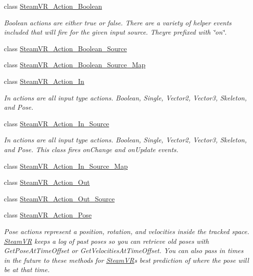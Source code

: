 \begin{DoxyCompactItemize}
class \mbox{\hyperlink{class_valve_1_1_v_r_1_1_steam_v_r___action___boolean}{Steam\+V\+R\+\_\+\+Action\+\_\+\+Boolean}}
\begin{DoxyCompactList}\small\item\em Boolean actions are either true or false. There are a variety of helper events included that will fire for the given input source. They\textquotesingle{}re prefixed with \char`\"{}on\char`\"{}. \end{DoxyCompactList}\item 
class \mbox{\hyperlink{class_valve_1_1_v_r_1_1_steam_v_r___action___boolean___source}{Steam\+V\+R\+\_\+\+Action\+\_\+\+Boolean\+\_\+\+Source}}
\item 
class \mbox{\hyperlink{class_valve_1_1_v_r_1_1_steam_v_r___action___boolean___source___map}{Steam\+V\+R\+\_\+\+Action\+\_\+\+Boolean\+\_\+\+Source\+\_\+\+Map}}
\item 
class \mbox{\hyperlink{class_valve_1_1_v_r_1_1_steam_v_r___action___in}{Steam\+V\+R\+\_\+\+Action\+\_\+\+In}}
\begin{DoxyCompactList}\small\item\em In actions are all input type actions. Boolean, Single, Vector2, Vector3, Skeleton, and Pose. \end{DoxyCompactList}\item 
class \mbox{\hyperlink{class_valve_1_1_v_r_1_1_steam_v_r___action___in___source}{Steam\+V\+R\+\_\+\+Action\+\_\+\+In\+\_\+\+Source}}
\begin{DoxyCompactList}\small\item\em In actions are all input type actions. Boolean, Single, Vector2, Vector3, Skeleton, and Pose. This class fires on\+Change and on\+Update events. \end{DoxyCompactList}\item 
class \mbox{\hyperlink{class_valve_1_1_v_r_1_1_steam_v_r___action___in___source___map}{Steam\+V\+R\+\_\+\+Action\+\_\+\+In\+\_\+\+Source\+\_\+\+Map}}
\item 
class \mbox{\hyperlink{class_valve_1_1_v_r_1_1_steam_v_r___action___out}{Steam\+V\+R\+\_\+\+Action\+\_\+\+Out}}
\item 
class \mbox{\hyperlink{class_valve_1_1_v_r_1_1_steam_v_r___action___out___source}{Steam\+V\+R\+\_\+\+Action\+\_\+\+Out\+\_\+\+Source}}
\item 
class \mbox{\hyperlink{class_valve_1_1_v_r_1_1_steam_v_r___action___pose}{Steam\+V\+R\+\_\+\+Action\+\_\+\+Pose}}
\begin{DoxyCompactList}\small\item\em Pose actions represent a position, rotation, and velocities inside the tracked space. \mbox{\hyperlink{class_valve_1_1_v_r_1_1_steam_v_r}{Steam\+VR}} keeps a log of past poses so you can retrieve old poses with Get\+Pose\+At\+Time\+Offset or Get\+Velocities\+At\+Time\+Offset. You can also pass in times in the future to these methods for \mbox{\hyperlink{class_valve_1_1_v_r_1_1_steam_v_r}{Steam\+VR}}\textquotesingle{}s best prediction of where the pose will be at that time. \end{DoxyCompactList}\item 

\end{DoxyCompactItemize}
